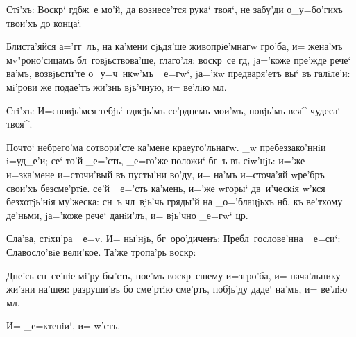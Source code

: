 Стi'хъ: Воскр` гд бж~е мо'й, да вознесе'тся 
рука` твоя`, не забу'ди о_у=бо'гихъ твои'хъ до конца`.

Блиста'яйся а='гг~лъ, на ка'мени сjьдя'ше 
живопрiе'мнагw гро'ба, и= жена'мъ мv"роно'сицамъ 
бл~говjьствова'ше, глаго'ля: воскр~се гд, jа='коже 
пре'жде рече` ва'мъ, возвjьсти'те о_у=ч~нкw'мъ _е=гw`, 
jа='кw предваря'етъ вы` въ галiле'и: мi'рови же подае'тъ 
жи'знь вjь'чную, и= ве'лiю мл.

Стi'хъ: И=сповjь'мся тебjь` гд всjь'мъ се'рдцемъ 
мои'мъ, повjь'мъ вся^ чудеса` твоя^.

Почто` небрего'ма сотвори'сте ка'мене краеуго'льнагw. 
_w пребеззако'ннiи i=уд_е'и; се` то'й _е='сть, _е=го'же 
положи` бг~ъ въ сiw'нjь: и='же и=з\ъ ка'мене и=сточи'вый 
въ пусты'ни во'ду, и= на'мъ и=сточа'яй w\т ре'бръ свои'хъ 
безсме'ртiе. се'й _е='сть ка'мень, и='же w\т горы` 
дв~и'ческiя w'кся без\ъ хотjь'нiя му'жеска: сн~ъ 
чл~вjь'чь гряды'й на _о='блацjьхъ нб, къ ве'тхому 
де'ньми, jа='коже рече` данiи'лъ, и= вjь'чно _е=гw` 
цр.

Сла'ва, стiхи'ра _е=v. И= ны'нjь, 
бг~оро'диченъ: Пребл~гослове'нна _е=си`: Славосло'вiе 
вели'кое. Та'же тропа'рь воскр:

Дне'сь сп~се'нiе мi'ру бы'сть, пое'мъ воскр~сшему 
и=з\ъ гро'ба, и= нача'льнику жи'зни на'шея: разруши'въ бо 
сме'ртiю сме'рть, побjь'ду даде` на'мъ, и= ве'лiю мл.

И= _е=ктенiи`, и= w'стъ.

